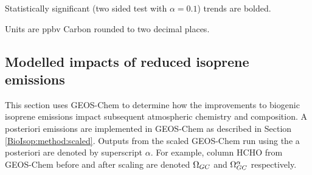 \begin{table}
\begin{threeparttable}
\begin{tabular}{ l | c  c }
          \bottomrule
        \end{tabular}
        \begin{tablenotes} 
          \item Statistically significant (two sided test with $\alpha=0.1$) trends are bolded.
          \item Units are ppbv Carbon rounded to two decimal places.
        \end{tablenotes}
        \label{BioIsop:results:trends:tab_trends}
      \end{threeparttable}\end{table}
      
      
      
            
      
    
    
  \subsection{Modelled impacts of reduced isoprene emissions}
  \label{BioIsop:results:new_emiss}
    
    This section uses GEOS-Chem to determine how the improvements to biogenic isoprene emissions impact subsequent atmospheric chemistry and composition.
    A posteriori emissions are implemented in GEOS-Chem as described in Section \ref{BioIsop:method:scaled}.
    Outputs from the scaled GEOS-Chem run using the a posteriori are denoted by superscript $\alpha$.
    For example, column HCHO from GEOS-Chem before and after scaling are denoted $\Omega_{GC}$ and $\Omega_{GC}^{\alpha}$ respectively.
    
